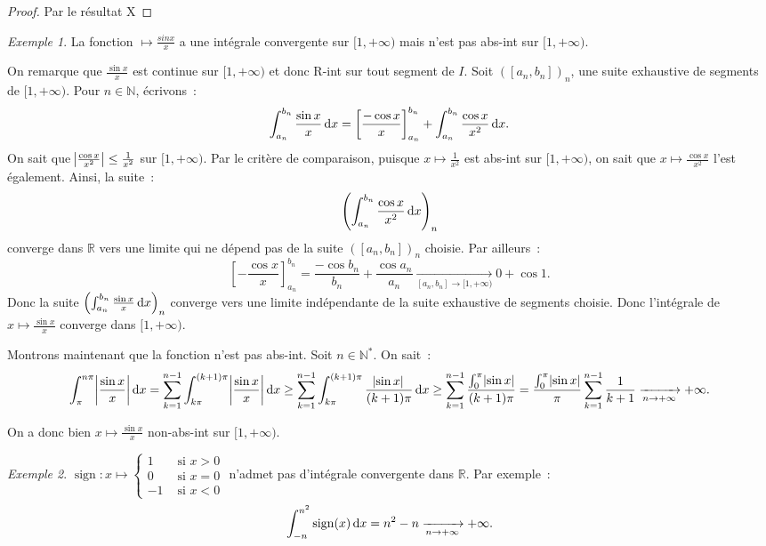 \documentclass{report}
\theoremstyle{definition}
\theoremstyle{remark}
\newtheorem{ex}{Exemple}[chapter]
\newcommand{\R}{\mathbb R}
\newcommand{\N}{\mathbb N}
\newcommand{\Ns}{\N^{*}}
\DeclareMathOperator{\sign}{sign}
\newcommand{\pinfty}{{+\infty}}
\begin{document}
			\begin{proof} Par le résultat X %
			\end{proof}

			\begin{ex} La fonction $\mapsto \frac {sin x}x$ a une intégrale convergente sur $[1, \pinfty)$ mais n'est pas abs-int sur $[1, \pinfty)$.

			On remarque que $\frac {\sin x}x$ est continue sur $[1, \pinfty)$ et donc R-int sur tout segment de $I$. Soit $([a_n, b_n])_n$, une suite exhaustive de
			segments de $[1, \pinfty)$. Pour $n \in \N$, écrivons~:
			\[\int_{a_n}^{b_n}\frac {\sin x}x\dif x = \left[\frac{-\cos x}x\right]_{a_n}^{b_n} + \int_{a_n}^{b_n}\frac{\cos x}{x^2}\dif x.\]
			On sait que $\abs {\frac{\cos x}{x^2}} \leq \frac 1{x^2}$ sur $[1, \pinfty)$. Par le critère de comparaison, puisque $x \mapsto \frac 1{x^2}$ est abs-int
			sur $[1, \pinfty)$, on sait que $x \mapsto \frac{\cos x}{x^2}$ l'est également. Ainsi, la suite~:
			\[\left(\int_{a_n}^{b_n}\frac{\cos x}{x^2}\dif x\right)_n\]
			converge dans $\R$ vers une limite qui ne dépend pas de la suite $([a_n, b_n])_n$ choisie. Par ailleurs~:
			\[\left[-\frac {\cos x}x\right]_{a_n}^{b_n} = \frac{-\cos b_n}{b_n} + \frac{\cos a_n}{a_n} \xrightarrow[{[a_n, b_n] \to [1, \pinfty)}]{} 0 + \cos 1.\]
			Donc la suite $\left(\int_{a_n}^{b_n}\frac{\sin x}x\dif x\right)_n$ converge vers une limite indépendante de la suite exhaustive de segments choisie.
			Donc l'intégrale de $x \mapsto \frac{\sin x}x$ converge dans $[1, \pinfty)$.

			Montrons maintenant que la fonction n'est pas abs-int. Soit $n \in \Ns$. On sait~:
			\[\int_\pi^{n\pi}\abs {\frac{\sin x}x}\dif x = \sum_{k=1}^{n-1}\int_{k\pi}^{(k+1)\pi}\abs {\frac{\sin x}x}\dif x
				\geq \sum_{k=1}^{n-1}\int_{k\pi}^{(k+1)\pi}\frac {\abs {\sin x}}{(k+1)\pi}\dif x \geq \sum_{k=1}^{n-1}\frac {\int_0^\pi\abs {\sin x}}{(k+1)\pi}
				= \frac {\int_0^\pi\abs {\sin x}}{\pi}\sum_{k=1}^{n-1} \frac 1{k+1}\xrightarrow[n \to \pinfty]{} \pinfty.\]

			On a donc bien $x \mapsto \frac{\sin x}x$ non-abs-int sur $[1, \pinfty)$.
			\end{ex}

			\begin{ex} $\sign : x \mapsto \begin{cases}1 &\text{ si } x > 0 \\0 &\text{ si }x = 0\\-1 &\text{ si } x < 0\end{cases}$ n'admet pas d'intégrale convergente
			dans $\R$. Par exemple~:
			\[\int_{-n}^{n^2}\sign(x)\dif x = n^2 - n \xrightarrow[n \to \pinfty]{} \pinfty.\]
			\end{ex}
\end{document}

